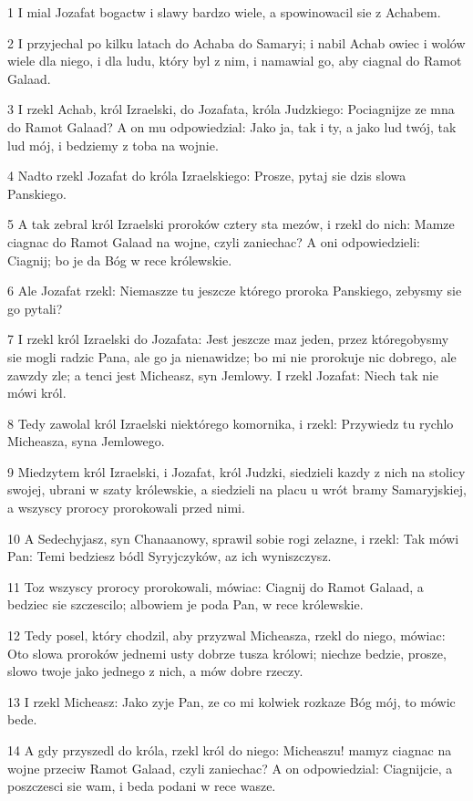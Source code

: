 \par 1 I mial Jozafat bogactw i slawy bardzo wiele, a spowinowacil sie z Achabem.
\par 2 I przyjechal po kilku latach do Achaba do Samaryi; i nabil Achab owiec i wolów wiele dla niego, i dla ludu, który byl z nim, i namawial go, aby ciagnal do Ramot Galaad.
\par 3 I rzekl Achab, król Izraelski, do Jozafata, króla Judzkiego: Pociagnijze ze mna do Ramot Galaad? A on mu odpowiedzial: Jako ja, tak i ty, a jako lud twój, tak lud mój, i bedziemy z toba na wojnie.
\par 4 Nadto rzekl Jozafat do króla Izraelskiego: Prosze, pytaj sie dzis slowa Panskiego.
\par 5 A tak zebral król Izraelski proroków cztery sta mezów, i rzekl do nich: Mamze ciagnac do Ramot Galaad na wojne, czyli zaniechac? A oni odpowiedzieli: Ciagnij; bo je da Bóg w rece królewskie.
\par 6 Ale Jozafat rzekl: Niemaszze tu jeszcze którego proroka Panskiego, zebysmy sie go pytali?
\par 7 I rzekl król Izraelski do Jozafata: Jest jeszcze maz jeden, przez któregobysmy sie mogli radzic Pana, ale go ja nienawidze; bo mi nie prorokuje nic dobrego, ale zawzdy zle; a tenci jest Micheasz, syn Jemlowy. I rzekl Jozafat: Niech tak nie mówi król.
\par 8 Tedy zawolal król Izraelski niektórego komornika, i rzekl: Przywiedz tu rychlo Micheasza, syna Jemlowego.
\par 9 Miedzytem król Izraelski, i Jozafat, król Judzki, siedzieli kazdy z nich na stolicy swojej, ubrani w szaty królewskie, a siedzieli na placu u wrót bramy Samaryjskiej, a wszyscy prorocy prorokowali przed nimi.
\par 10 A Sedechyjasz, syn Chanaanowy, sprawil sobie rogi zelazne, i rzekl: Tak mówi Pan: Temi bedziesz bódl Syryjczyków, az ich wyniszczysz.
\par 11 Toz wszyscy prorocy prorokowali, mówiac: Ciagnij do Ramot Galaad, a bedziec sie szczescilo; albowiem je poda Pan, w rece królewskie.
\par 12 Tedy posel, który chodzil, aby przyzwal Micheasza, rzekl do niego, mówiac: Oto slowa proroków jednemi usty dobrze tusza królowi; niechze bedzie, prosze, slowo twoje jako jednego z nich, a mów dobre rzeczy.
\par 13 I rzekl Micheasz: Jako zyje Pan, ze co mi kolwiek rozkaze Bóg mój, to mówic bede.
\par 14 A gdy przyszedl do króla, rzekl król do niego: Micheaszu! mamyz ciagnac na wojne przeciw Ramot Galaad, czyli zaniechac? A on odpowiedzial: Ciagnijcie, a poszczesci sie wam, i beda podani w rece wasze.
